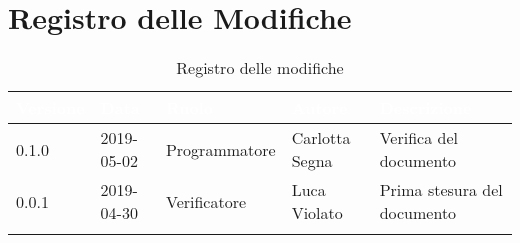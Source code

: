 \newpage

\section*{Registro delle Modifiche}

\begin{center}
\begin{longtable}[c]{|m{}|m{}|m{}|m{}|p{}|}
\hline
\rowcolor{bluelogo}\textbf{\textcolor{white}{Versione}} & \textbf{\textcolor{white}{Data}} & \textbf{\textcolor{white}{Ruolo}} & \textbf{\textcolor{white}{Autore}} & \textbf{\textcolor{white}{Descrizione}}\\
\endfirsthead
\hline \hline
\rowcolor{grigio} 0.1.0 & 2019-05-02 & Programmatore & Carlotta Segna & Verifica del documento \\
\hline
0.0.1 & 2019-04-30 & Verificatore & Luca Violato & Prima stesura del documento\\
\hline
\caption{Registro delle modifiche}
\end{longtable}
\end{center}
